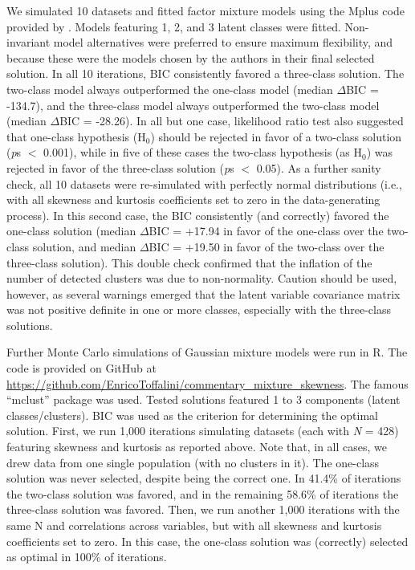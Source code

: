 \documentclass[letterpaper,11pt]{article}
\begin{document}
We simulated 10 datasets and fitted factor mixture models using the Mplus code provided by . Models featuring 1, 2, and 3 latent classes were fitted. Non-invariant model alternatives were preferred to ensure maximum flexibility, and because these were the models chosen by the authors in their final selected solution. In all 10 iterations, BIC consistently favored a three-class solution. The two-class model always outperformed the one-class model (median $\Delta$BIC = -134.7), and the three-class model always outperformed the two-class model (median $\Delta$BIC = -28.26). In all but one case, likelihood ratio test also suggested that one-class hypothesis (H$_{0}$) should be rejected in favor of a two-class solution (\textit{p}s $<$ 0.001), while in five of these cases the two-class hypothesis (as H$_{0}$) was rejected in favor of the three-class solution (\textit{p}s $<$ 0.05). As a further sanity check, all 10 datasets were re-simulated with perfectly normal distributions (i.e., with all skewness and kurtosis coefficients set to zero in the data-generating process). In this second case, the BIC consistently (and correctly) favored the one-class solution (median $\Delta$BIC = +17.94 in favor of the one-class over the two-class solution, and median $\Delta$BIC = +19.50 in favor of the two-class over the three-class solution). This double check confirmed that the inflation of the number of detected clusters was due to non-normality. Caution should be used, however, as several warnings emerged that the latent variable covariance matrix was not positive definite in one or more classes, especially with the three-class solutions.

Further Monte Carlo simulations of Gaussian mixture models were run in R. The code is provided on GitHub at \url{https://github.com/EnricoToffalini/commentary_mixture_skewness}. The famous “mclust” package \cite{scrucca2016mclust} was used. Tested solutions featured 1 to 3 components (latent classes/clusters). BIC was used as the criterion for determining the optimal solution. First, we run 1,000 iterations simulating datasets (each with \textit{N} = 428) featuring skewness and kurtosis as reported above. Note that, in all cases, we drew data from one single population (with no clusters in it). The one-class solution was never selected, despite being the correct one. In 41.4\% of iterations the two-class solution was favored, and in the remaining 58.6\% of iterations the three-class solution was favored. Then, we run another 1,000 iterations with the same N and correlations across variables, but with all skewness and kurtosis coefficients set to zero. In this case, the one-class solution was (correctly) selected as optimal in 100\% of iterations.
\end{document}
